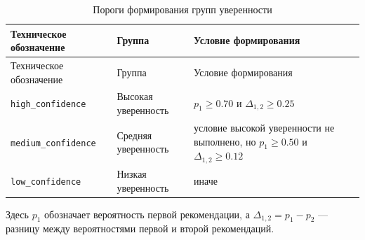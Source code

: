 \begin{center}
\small
\begin{longtable}{p{} p{} p{}}
\caption{Пороги формирования групп уверенности}
\label{tab:confidence-thresholds}\\
\toprule
Техническое обозначение & Группа & Условие формирования \\
\midrule
\endfirsthead

\toprule
Техническое обозначение & Группа & Условие формирования \\
\midrule
\endhead

\bottomrule
\endlastfoot

\texttt{high\_confidence} &
Высокая уверенность &
\(p_1 \ge 0.70\) и \(\Delta_{1,2} \ge 0.25\) \\

\texttt{medium\_confidence} &
Средняя уверенность &
условие высокой уверенности не выполнено, но \(p_1 \ge 0.50\) и \(\Delta_{1,2} \ge 0.12\) \\

\texttt{low\_confidence} &
Низкая уверенность &
иначе \\

\end{longtable}
\footnotesize
Здесь \(p_1\) обозначает вероятность первой рекомендации, а
\(\Delta_{1,2}=p_1-p_2\) --- разницу между вероятностями первой и второй рекомендаций.
\normalsize
\end{center}
